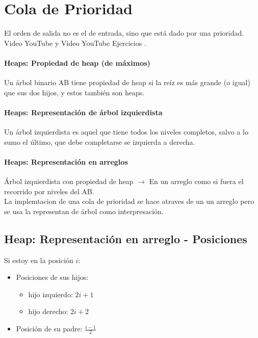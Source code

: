 \documentclass[../main.tex]{subfiles}
\begin{document}
\section{Cola de Prioridad} 
    El orden de salida no es el de entrada, sino que está dado por una prioridad. Video YouTube \cite{Cola_de_prioridad_youtube} y Video YouTube Ejercicios \cite{Cola_de_prioridad_ejercicios_youtube}.

    \paragraph{Heaps: Propiedad de heap (de máximos)}
    Un árbol binario AB tiene propiedad de heap si la reíz es más grande (o igual) que sus dos hijos, y estos también son heaps.
        
    \paragraph{Heaps: Representación de árbol izquierdista}
    Un árbol izquierdista es aquel que tiene todos los niveles completos, salvo a lo sumo el último, que debe completarse se izquierda a derecha.

    \paragraph{Heaps: Representación en arreglos}
    Árbol izquierdista con propiedad de heap $\rightarrow$ En un arreglo como si fuera el recorrido por niveles del AB.\\


    La implemtacion de una cola de prioridad se hace atraves de un un arreglo pero se usa la representan de árbol como interpresación.

    \subsection{Heap: Representación en arreglo - Posiciones}
        Si estoy en la posición $i$:
        \begin{itemize}
            \item Posiciones de sus hijos:
                \begin{itemize}
                    \item hijo izquierdo: $2i + 1$
                    \item hijo derecho: $2i + 2$
                \end{itemize}
            \item Posición de su padre: $\frac{i-1}{2}$
        \end{itemize}
\end{document}

